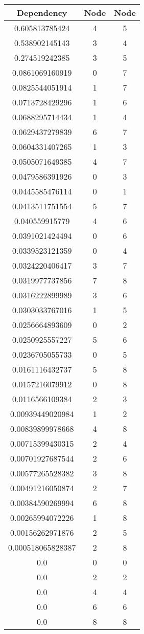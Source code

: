 \begin{center}
\begin{tabular}{||c c c||}
\hline
Dependency & Node & Node \\
\hline \hline
0.605813785424 & 4 & 5\\
\hline
0.538902145143 & 3 & 4\\
\hline
0.274519242385 & 3 & 5\\
\hline
0.0861069160919 & 0 & 7\\
\hline
0.0825544051914 & 1 & 7\\
\hline
0.0713728429296 & 1 & 6\\
\hline
0.0688295714434 & 1 & 4\\
\hline
0.0629437279839 & 6 & 7\\
\hline
0.0604331407265 & 1 & 3\\
\hline
0.0505071649385 & 4 & 7\\
\hline
0.0479586391926 & 0 & 3\\
\hline
0.0445585476114 & 0 & 1\\
\hline
0.0413511751554 & 5 & 7\\
\hline
0.040559915779 & 4 & 6\\
\hline
0.0391021424494 & 0 & 6\\
\hline
0.0339523121359 & 0 & 4\\
\hline
0.0324220406417 & 3 & 7\\
\hline
0.0319977737856 & 7 & 8\\
\hline
0.0316222899989 & 3 & 6\\
\hline
0.0303033767016 & 1 & 5\\
\hline
0.0256664893609 & 0 & 2\\
\hline
0.0250925557227 & 5 & 6\\
\hline
0.0236705055733 & 0 & 5\\
\hline
0.0161116432737 & 5 & 8\\
\hline
0.0157216079912 & 0 & 8\\
\hline
0.0116566109384 & 2 & 3\\
\hline
0.00939449020984 & 1 & 2\\
\hline
0.00839899978668 & 4 & 8\\
\hline
0.00715399430315 & 2 & 4\\
\hline
0.00701927687544 & 2 & 6\\
\hline
0.00577265528382 & 3 & 8\\
\hline
0.00491216050874 & 2 & 7\\
\hline
0.00384590269994 & 6 & 8\\
\hline
0.00265994072226 & 1 & 8\\
\hline
0.00156262971876 & 2 & 5\\
\hline
0.000518065828387 & 2 & 8\\
\hline
0.0 & 0 & 0\\
\hline
0.0 & 2 & 2\\
\hline
0.0 & 4 & 4\\
\hline
0.0 & 6 & 6\\
\hline
0.0 & 8 & 8\\
\hline
\end{tabular}
\end{center}
